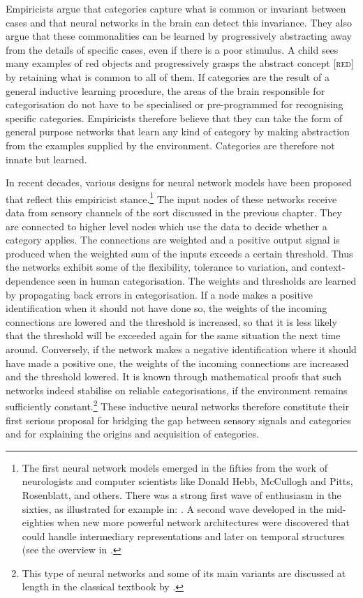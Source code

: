 Empiricists argue that categories 
capture what is common or invariant between cases and that
neural networks in the brain
can detect this invariance. They also argue
that these commonalities can be learned
by progressively abstracting away from the details of specific
cases, even if there is a poor stimulus. 
A child sees many examples of red objects and
progressively grasps the abstract concept [\textsc{red}] 
by retaining what is common to all of them. 
If categories are the result of a general 
inductive learning procedure, the areas of the brain
responsible for categorisation do not have to be
specialised or pre-programmed for recognising 
specific categories. Empiricists therefore believe that 
they can take the 
form of general purpose networks that learn any kind 
of category by making abstraction from the examples 
supplied by the environment. Categories are therefore
not innate but learned. 

In recent decades, various designs for neural network models
have been proposed that reflect this empiricist stance.\footnote{
The first neural network models emerged in the 
fifties from the work of neurologists and computer 
scientists like Donald Hebb, McCullogh and Pitts, 
Rosenblatt, and others. There was a strong first wave of 
enthusiasm in the sixties, as illustrated for 
example in: \cite{Minsky:1968}. 
A second wave developed in the mid-eighties when 
new more powerful network architectures were discovered
that could handle intermediary representations and 
later on temporal structures (see the overview 
in \cite{Churchland:1992}. }
The input nodes of these networks receive data
from sensory channels of the sort discussed in the 
previous chapter. They are connected to higher
level nodes which use the data to decide whether
a category applies. The connections are weighted and 
a positive output signal is produced when 
the weighted sum of the inputs 
exceeds a certain threshold. Thus the networks
exhibit some of the flexibility, tolerance
to variation, and context-dependence seen in human
categorisation. The weights and thresholds are 
learned by propagating back errors in categorisation. 
If a node makes a positive identification when 
it should not have done so, the weights of the 
incoming connections are lowered and the threshold is
increased, so that it is less likely that the threshold
will be exceeded again for the same situation the next time around. 
Conversely, if the network makes a negative identification where
it should have made a positive one, the weights 
of the incoming connections are increased 
and the threshold lowered. It is known 
through mathematical proofs that such networks indeed
stabilise on reliable categorisations, if the 
environment remains sufficiently constant.\footnote{
This type of neural networks and some of its
main variants are discussed at length in the classical 
textbook by \cite{Rumelhart:1986}.}
These inductive neural networks therefore
constitute their first serious proposal for bridging the gap between
sensory signals and categories and for explaining the 
origins and acquisition of categories. 

